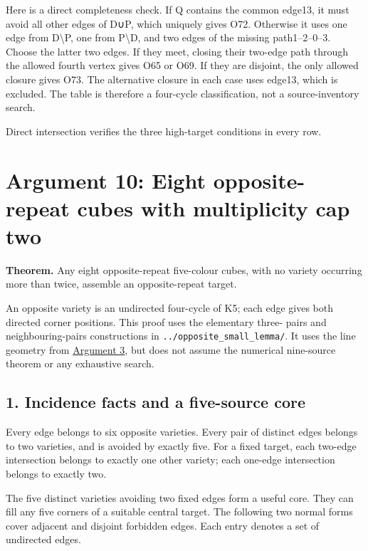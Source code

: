 \documentclass[
  10pt,
]{article}
\begin{document}
Here is a direct completeness check. If Q contains the common edge13, it
must avoid all other edges of D∪P, which uniquely gives O72. Otherwise
it uses one edge from D\textbackslash P, one from P\textbackslash D, and
two edges of the missing path1--2--0--3. Choose the latter two edges. If
they meet, closing their two-edge path through the allowed fourth vertex
gives O65 or O69. If they are disjoint, the only allowed closure gives
O73. The alternative closure in each case uses edge13, which is
excluded. The table is therefore a four-cycle classification, not a
source-inventory search.

Direct intersection verifies the three high-target conditions in every
row.

\hypertarget{arg-10}{%
\section{Argument 10: Eight opposite-repeat cubes with multiplicity cap
two}\label{arg-10}}

\textbf{Theorem.} Any eight opposite-repeat five-colour cubes, with no
variety occurring more than twice, assemble an opposite-repeat target.

An opposite variety is an undirected four-cycle of K5; each edge gives
both directed corner positions. This proof uses the elementary three-
pairs and neighbouring-pairs constructions in
\texttt{../opposite\_small\_lemma/}. It uses the line geometry from
\protect\hyperlink{arg-3}{Argument 3}, but does not assume the numerical
nine-source theorem or any exhaustive search.

\hypertarget{incidence-facts-and-a-five-source-core}{%
\subsection*{1. Incidence facts and a five-source
core}\label{incidence-facts-and-a-five-source-core}}

Every edge belongs to six opposite varieties. Every pair of distinct
edges belongs to two varieties, and is avoided by exactly five. For a
fixed target, each two-edge intersection belongs to exactly one other
variety; each one-edge intersection belongs to exactly two.

The five distinct varieties avoiding two fixed edges form a useful core.
They can fill any five corners of a suitable central target. The
following two normal forms cover adjacent and disjoint forbidden edges.
Each entry denotes a set of undirected edges.
\end{document}
